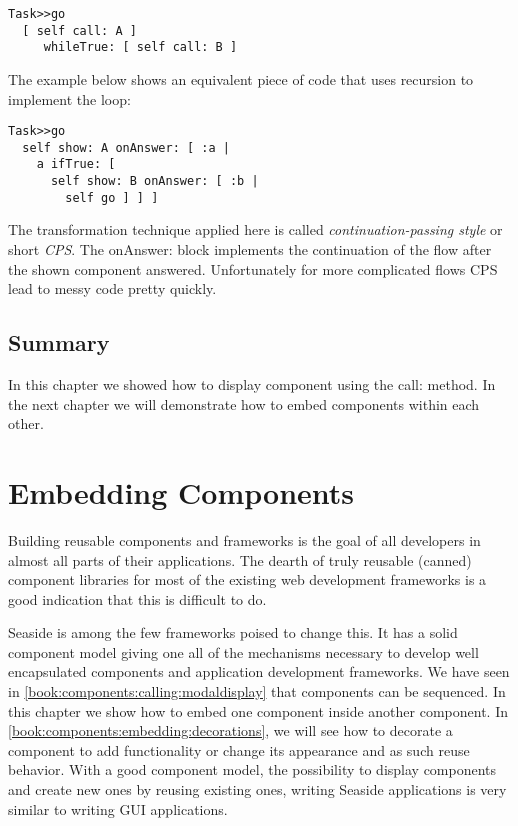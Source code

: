 \documentclass[a4paper,10pt,twoside]{book}
\newcommand{\ct}[1]{{\small\ttfamily\textup{#1}}}
\begin{document}
\begin{lstlisting}
Task>>go
  [ self call: A ]
     whileTrue: [ self call: B ]
\end{lstlisting}

The example below shows an equivalent piece of code that uses recursion to implement the loop:

\begin{lstlisting}
Task>>go
  self show: A onAnswer: [ :a |
    a ifTrue: [
      self show: B onAnswer: [ :b |
        self go ] ] ]
\end{lstlisting}

The transformation technique applied here is called \textit{continuation-passing style} or short \textit{CPS}. The \ct{onAnswer:} block implements the continuation of the flow after the shown component answered. Unfortunately for more complicated flows CPS lead to messy code pretty quickly.

\section{Summary}
\label{book:components:calling:summary}

In this chapter we showed how to display component using the \ct{call:} method. In the next chapter we will demonstrate how to embed components within each other.

\chapter{Embedding Components}
\label{book:components:embedding}

Building reusable components and frameworks is the goal of all developers in almost all parts of their applications. The dearth of truly reusable (canned) component libraries for most of the existing web development frameworks is a good indication that this is difficult to do.

Seaside is among the few frameworks poised to change this. It has a solid component model giving one all of the mechanisms necessary to develop well encapsulated components and application development frameworks. We have seen in \autoref{book:components:calling:modaldisplay} that components can be sequenced. In this chapter we show how to embed one component inside another component. In \autoref{book:components:embedding:decorations}, we will see how to decorate a component to add functionality or change its appearance and as such reuse behavior. With a good component model, the possibility to display components and create new ones by reusing existing ones, writing Seaside applications is very similar to writing GUI applications.
\end{document}
